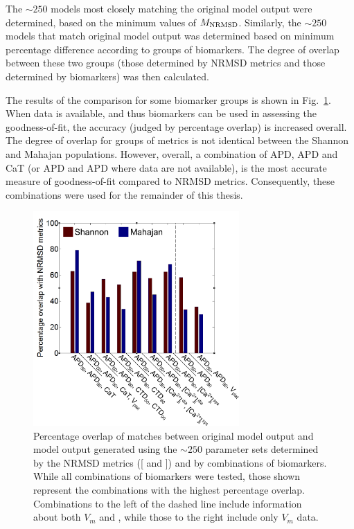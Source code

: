 \documentclass[../thesis-main.tex]{subfiles}
\begin{document}
The $\sim250$ models most closely matching the original model output were determined, based on the minimum values of $M_\textnormal{NRMSD}$. Similarly, the $\sim250$ models that match original model output was determined based on minimum percentage difference according to groups of biomarkers. The degree of overlap between these two groups (those determined by NRMSD metrics and those determined by biomarkers) was then calculated.

The results of the comparison for some biomarker groups is shown in Fig.~\ref{fig:biomarker-compare}. When \cai{} data is available, and thus \ca{} biomarkers can be used in assessing the goodness-of-fit, the accuracy (judged by percentage overlap) is increased overall. The degree of overlap for groups of metrics is not identical between the Shannon and Mahajan populations. However, overall, a combination of APD, APD and CaT (or APD and APD where \cai{} data are not available), is the most accurate measure of goodness-of-fit compared to NRMSD metrics. Consequently, these combinations were used for the remainder of this thesis.
\begin{figure}
 \centering
 \includegraphics[width=0.7\textwidth]{biomarker-compare}
 \caption[Efficacy of biomarkers in determining goodness-of-fit.]{Percentage overlap of matches between original model output and model output generated using the $\sim250$ parameter sets determined by the NRMSD metrics ([\aprms{} and \carms{}]) and by combinations of biomarkers. While all combinations of biomarkers were tested, those shown represent the combinations with the highest percentage overlap. Combinations to the left of the dashed line include information about both $V_m$ and \cai{}, while those to the right include only $V_m$ data.}
 \label{fig:biomarker-compare}
\end{figure}
\end{document}
